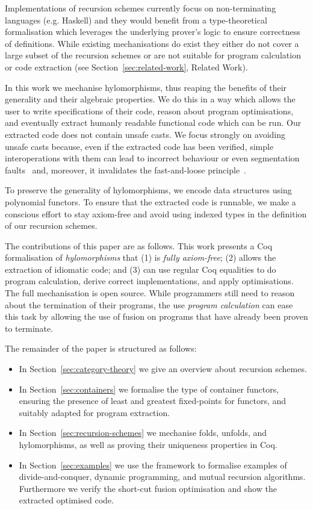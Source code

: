 \documentclass[a4paper,anonymous, UKenglish,cleveref, autoref, thm-restate]{lipics-v2021}
\newcommand{\dcas}[1]{\textcolor{ForestGreen}{\textsc{David}: #1}}
\begin{document}
Implementations of recursion schemes currently focus on non-terminating
languages (e.g. Haskell) and they would benefit from a type-theoretical
formalisation which leverages the underlying prover's logic to ensure
correctness of definitions.  While existing mechanisations do exist they either
do not cover a large subset of the recursion schemes or are not suitable for
program calculation or code extraction (see Section~\ref{sec:related-work},
Related Work).

In this work we mechanise hylomorphisms, thus reaping the benefits of their
generality and their algebraic properties. We do this in a way which allows the
user to write specifications of their code, reason about program optimisations,
and eventually extract humanly readable functional code which can be run. Our
extracted code does not contain unsafe casts. We focus strongly on avoiding
unsafe casts because, even if the extracted code has been verified, simple
interoperations with them can lead to incorrect behaviour or even segmentation
faults~\cite{forster:hal-04329663} and, moreover, it invalidates the
fast-and-loose principle~\cite{DanielssonHJG06}.

To preserve the generality of hylomorphisms, we encode data structures using
polynomial functors. To ensure that the extracted code is runnable, we make a
conscious effort to stay axiom-free and avoid using indexed types in the
definition of our recursion schemes.

The contributions of this paper are as follows. This work presents a Coq
formalisation of \emph{hylomorphisms} that (1) is \emph{fully axiom-free}; (2)
allows the extraction of idiomatic code; and (3) can use regular Coq
equalities to do program calculation, derive correct implementations, and apply
optimisations.  The full mechanisation is open source.
While programmers still need to reason about the termination of their programs,
the use \emph{program calculation} can ease this task by allowing the use of
fusion on programs that have already been proven to terminate.

The remainder of the paper is structured as follows:
\begin{itemize}
  \item In Section~\ref{sec:category-theory} we give an overview about recursion
schemes.
  \item In Section~\ref{sec:containers} we formalise the type of container
    functors, ensuring the presence of least and greatest fixed-points for
    functors, and suitably adapted for program extraction.
  \item In Section~\ref{sec:recursion-schemes} we mechanise folds, unfolds, and
    hylomorphisms, as well as proving their uniqueness properties in Coq.
  \item In Section~\ref{sec:examples} we use the framework to formalise examples
    of divide-and-conquer, dynamic programming, and mutual recursion algorithms.
    Furthermore we verify the short-cut fusion optimisation and show the
    extracted optimised code.
\end{itemize}
\end{document}
